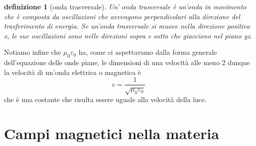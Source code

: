 \documentclass[10pt,a4paper]{article}
\newtheorem{definizione}{definizione}
\begin{document}
\begin{definizione}[onda trasversale]
	Un' onda trasversale è un'onda in movimento che è composta da oscillazioni che avvengono perpendicolari alla direzione del trasferimento di energia. Se un'onda trasversale si muove nella direzione positiva x, le sue oscillazioni sono nelle direzioni sopra e sotto che giacciono nel piano yz.
\end{definizione}
Notiamo infine che $\mu_0\varepsilon_0$ ha, come ci aspettavamo dalla forma generale dell'equazione delle onde piane, le dimensioni di una velocità alle meno 2 dunque la velocità di un'onda elettrica o magnetica è 
\[v = \frac{1}{\sqrt{\mu_0\varepsilon_0}}\]
che è una costante che risulta essere uguale alla velocità della luce. 
\section{Campi magnetici nella materia}
\end{document}
